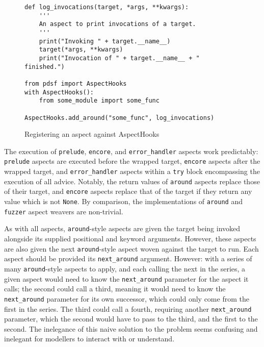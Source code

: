 \begin{figure}[t]
    \begin{lstlisting}
def log_invocations(target, *args, **kwargs):
    '''
    An aspect to print invocations of a target.
    '''
    print("Invoking " + target.__name__)
    target(*args, **kwargs)
    print("Invocation of " + target.__name__ + " finished.")

from pdsf import AspectHooks
with AspectHooks():
    from some_module import some_func

AspectHooks.add_around("some_func", log_invocations)
    \end{lstlisting}
    \caption{Registering an aspect against AspectHooks}
    \label{fig:registering_an_aspect_against_aspecthooks}
\end{figure}

The execution of \lstinline{prelude}, \lstinline{encore}, and
\lstinline{error_handler} aspects work predictably: \lstinline{prelude} aspects
are executed before the wrapped target, \lstinline{encore} aspects after the
wrapped target, and \lstinline{error_handler} aspects within a \lstinline{try}
block encompassing the execution of all advice. Notably, the return values of
\lstinline{around} aspects replace those of their target, and \lstinline{encore}
aspects replace that of the target if they return any value which is not \lstinline{None}.
By comparison, the implementations of \lstinline{around} and \lstinline{fuzzer}
aspect weavers are non-trivial.

As with all aspects, \lstinline{around}-style aspects are given the target being invoked
alongside its supplied positional and keyword arguments. However, these aspects
are also given the next \lstinline{around}-style aspect woven against the target
to run. Each aspect should be provided its \lstinline{next_around} argument.
However: with a series of many \lstinline{around}-style aspects to apply, and
each calling the next in the series, a given aspect would need to know the
\lstinline{next_around} parameter for the aspect it calls; the second could call
a third, meaning it would need to know the \lstinline{next_around} parameter for
its own successor, which could only come from the first in the series. The third
could call a fourth, requiring another \lstinline{next_around} parameter, which
the second would have to pass to the third, and the first to the second. The
inelegance of this naive solution to the problem seems confusing and inelegant
for modellers to interact with or understand.

